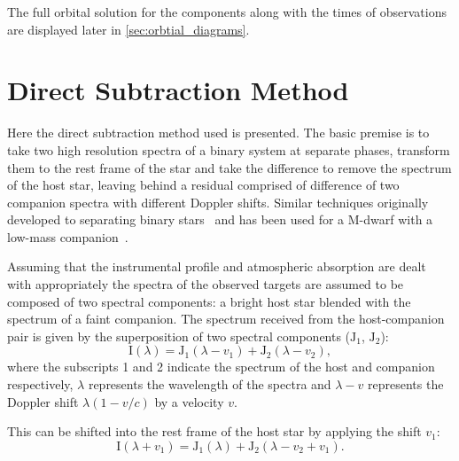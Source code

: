 The full orbital solution for the components along with the times of observations are displayed later in \cref{sec:orbtial_diagrams}.


\section{Direct Subtraction Method}
\label{sec:direct-subtraction}
Here the direct subtraction method used is presented.
The basic premise is to take two high resolution spectra of a binary system at separate phases, transform them to the rest frame of the star and take the difference to remove the spectrum of the host star, leaving behind a residual comprised of difference of two companion spectra with different Doppler shifts.
Similar techniques originally developed to separating binary stars~\citep{ferluga_separating_1997} and has been used for a M-dwarf with a low-mass companion~\citep[e.g.][]{kostogryz_spectral_2013}.

Assuming that the instrumental profile and atmospheric absorption are dealt with appropriately the spectra of the observed targets are assumed to be composed of two spectral components:
a bright host star blended with the spectrum of a faint companion.
The spectrum received from the host-companion pair is given by the superposition of two spectral components (\(\textrm{J}_{1}\), \(\textrm{J}_{2}\)):
\begin{equation}
\textrm{I}(\lambda) = \textrm{J}_{1}(\lambda - v_{1}) + \textrm{J}_{2}(\lambda - v_{2}),
\end{equation}
where the subscripts 1 and 2 indicate the spectrum of the host and companion respectively, \(\lambda\) represents the wavelength of the spectra and \(\lambda-v\) represents the Doppler shift \(\lambda(1-v/c)\) by a velocity \(v\).

This can be shifted into the rest frame of the host star by applying the shift \(v_1\):
\begin{equation}
\textrm{I}(\lambda + v_{1}) = \textrm{J}_{1}(\lambda) + \textrm{J}_{2}(\lambda - v_{2} + v_{1}).
\end{equation}

